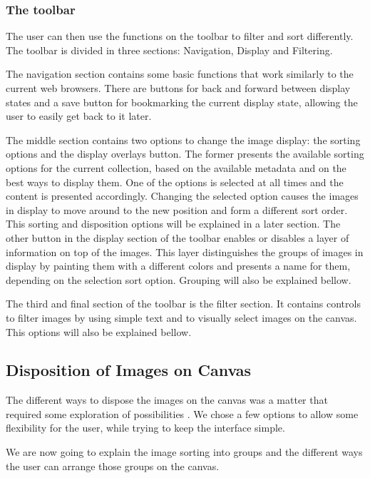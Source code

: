 \subsubsection{The toolbar}

The user can then use the functions on the toolbar to filter and sort differently. The toolbar is divided in three sections: Navigation, Display and Filtering.

The navigation section contains some basic functions that work similarly to the current web browsers. There are buttons for back and forward between display states and a save button for bookmarking the current display state, allowing the user to easily get back to it later.

The middle section contains two options to change the image display:  the sorting options and the display overlays button. The former presents the available sorting options for the current collection, based on the available metadata and on the best ways to display them. One of the options is selected at all times and the content is presented accordingly. Changing the selected option causes the images in display to move around to the new position and form a different sort order. This sorting and disposition options will be explained in a later section.
The other button in the display section of the toolbar enables or disables a layer of information on top of the images. This layer distinguishes the groups of images in display by painting them with a different colors and presents a name for them, depending on the selection sort option. Grouping will also be explained bellow. 

The third and final section of the toolbar is the filter section. It contains controls to filter images by using simple text and to visually select images on the canvas. This options will also be explained bellow.

\subsection{Disposition of Images on Canvas}

The different ways to dispose the images on the canvas was a matter that required some exploration of possibilities . We chose a few options to allow some flexibility for the user, while trying to keep the interface simple.

We are now going to explain the image sorting into groups and the different ways the user can arrange those groups on the canvas.

